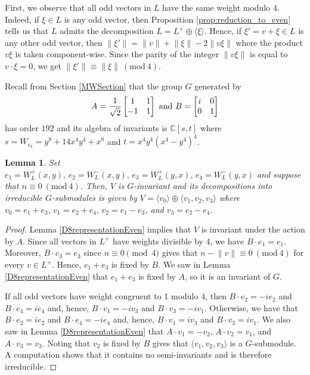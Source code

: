 \documentclass[a4paper,reqno]{amsart}
\newtheorem{lemma}[theorem]{Lemma}
\theoremstyle{definition}
\theoremstyle{remark} \newtheorem{remark}[theorem]{Remark}
\numberwithin{equation}{section}
\begin{document}
First, we observe that all odd vectors in \(L\) have the same weight modulo \(4\). Indeed, if \(\xi \in L\) is any odd vector, then Proposition \ref{prop:reduction_to_even} tells us that \(L\) admits the decomposition \(L = L^+ \oplus \langle \xi \rangle\). Hence, if \(\xi' = v + \xi \in L\) is any other odd vector, then \(\lVert \xi' \rVert = \lVert v \rVert + \lVert \xi \rVert - 2 \lVert v\xi \rVert\) where the product \(v \xi\) is taken component-wise. Since the parity of the integer \(\lVert v \xi \rVert\) is equal to \(v\cdot \xi = 0\), we get \(\lVert \xi' \rVert \equiv \lVert \xi \rVert \ (\textrm{mod}\ 4)\).

Recall from Section \ref{MWSection} that the group \(G\) generated by
\begin{equation*}
    A = \frac{1}{\sqrt{2}}
    \begin{bmatrix}
        1 & 1 \\
        -1 & 1
    \end{bmatrix}
    \textnormal{ and }
    B = 
    \begin{bmatrix}
        i & 0 \\
        0 & 1
    \end{bmatrix}
\end{equation*}
has order \(192\) and its algebra of invariants is \(\mathbb{C}[s,t]\) where \(s = W_{e_8} = y^8 + 14x^4y^4 + x^8\) and \(t = x^4y^4(x^4-y^4)^4\).

\begin{lemma}\label{repG_n=0(4)}
    Set \(e_1 = W_L^+(x,y),\, e_2 = W_L^-(x,y),\, e_3 = W_L^+(y,x),\, e_4 = W_L^-(y,x)\) and suppose that \(n \equiv 0 \ (\textrm{mod}\ 4)\). Then, \(V\) is \(G\)-invariant and its decompositions into irreducible \(G\)-submodules is given by \(V = \langle v_0 \rangle \oplus \langle v_1, v_2, v_3 \rangle\) where \(v_0 = e_1 + e_3,\, v_1 = e_2 + e_4,\, v_2 = e_1 - e_3\), and \(v_3 = e_2 - e_4\).
\end{lemma}

\begin{proof}
    Lemma \ref{D8representationEven} implies that \(V\) is invariant under the action by \(A\). Since all vectors in \(L^+\) have weights divisible by 4, we have \(B \cdot e_1 = e_1\). Moreover, \(B \cdot e_3 = e_3\) since \(n \equiv 0 \pmod{4}\) gives that \(n - \lVert v \rVert \equiv 0\ (\textrm{mod}\ 4)\) for every \(v \in L^+\). Hence, \(e_1+e_3\) is fixed by \(B\). We saw in Lemma \ref{D8representationEven} that \(e_1+e_3\) is fixed by \(A\), so it is an invariant of \(G\). 
    
    If all odd vectors have weight congruent to \(1\) modulo \(4\), then \(B \cdot e_2 = -i e_2\) and \(B \cdot e_4 = ie_4\) and, hence, \(B \cdot v_1 =-iv_3\) and \(B \cdot v_3 = -iv_1\). Otherwise, we have that \(B \cdot e_2 = ie_2\) and \(B \cdot e_4 = -ie_4\) and, hence, \(B \cdot v_1 = iv_3\) and \(B \cdot v_3 = iv_1\). We also saw in Lemma \ref{D8representationEven} that \(A \cdot v_1 = -v_2\), \(A \cdot v_2 = v_1\), and \(A \cdot v_3 = v_3\). Noting that \(v_2\) is fixed by \(B\) gives that \(\langle v_1, v_2, v_3 \rangle\) is a \(G\)-submodule. A computation shows that it contains no semi-invariants and is therefore irreducible.
\end{proof}
\end{document}
